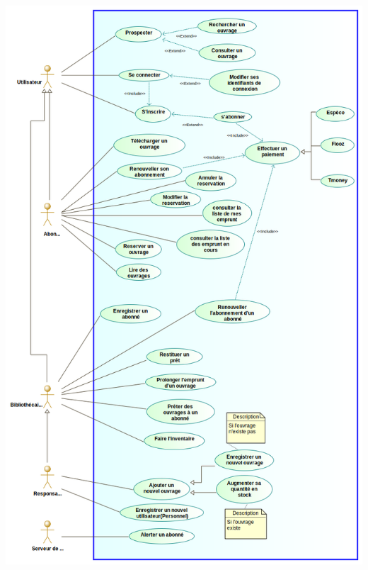 \documentclass[14pt,a4paper]{article}
\begin{document}
\includegraphics[scale=0.5]{images/UC.png}
\end{document}
